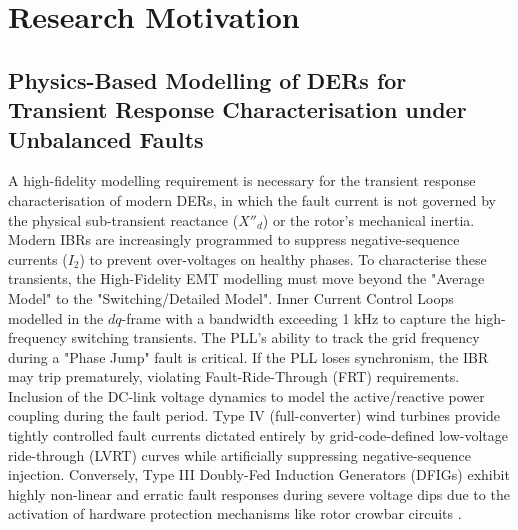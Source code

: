 \section{Research Motivation}



\subsection{Physics-Based Modelling of DERs for Transient Response Characterisation under Unbalanced Faults}

A high-fidelity modelling requirement is necessary for the transient response characterisation of modern DERs, in which the fault current is not governed by the physical sub-transient reactance ($X''_d$) or the rotor's mechanical inertia. Modern IBRs are increasingly programmed to suppress negative-sequence currents ($I_2$) to prevent over-voltages on healthy phases. To characterise these transients, the High-Fidelity EMT modelling must move beyond the "Average Model" to the "Switching/Detailed Model". Inner Current Control Loops modelled in the $dq$-frame with a bandwidth exceeding 1 kHz to capture the high-frequency switching transients. The PLL's ability to track the grid frequency during a "Phase Jump" fault is critical. If the PLL loses synchronism, the IBR may trip prematurely, violating Fault-Ride-Through (FRT) requirements. Inclusion of the DC-link voltage dynamics to model the active/reactive power coupling during the fault period. Type IV (full-converter) wind turbines provide tightly controlled fault currents dictated entirely by grid-code-defined low-voltage ride-through (LVRT) curves while artificially suppressing negative-sequence injection. Conversely, Type III Doubly-Fed Induction Generators (DFIGs) exhibit highly non-linear and erratic fault responses during severe voltage dips due to the activation of hardware protection mechanisms like rotor crowbar circuits \cite{ieeereportImpactofinverterbased}.







